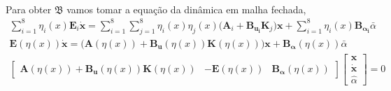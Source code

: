 \documentclass[a4paper,10pt]{article}
\begin{document}
\paragraph{}Para obter $\mathfrak{B}$ vamos tomar a equação da dinâmica em malha fechada,
\begin{gather}
	\sum_{i=1}^{8}\eta_i(x)\bm{E}_i\dot{\bm{x}} = \sum_{i=1}^{8}\sum_{j=1}^{8}\eta_i(x)\eta_j(x)\big(\bm{A}_{i}+\bm{B_{u_{i}}}\bm{K}_{j}\big)\bm{x}  + \sum_{i=1}^{8}\eta_i(x)\bm{B_{\alpha_{i}}}\bar{\alpha} \\
	\bm{E}(\eta(x))\dot{\bm{x}} = \big(\bm{A}(\eta(x))+\bm{B_u}(\eta(x))\bm{K}(\eta(x))\big)\bm{x} + \bm{B_{\alpha}}(\eta(x))\bar{\alpha} \\
	\begin{bmatrix}
		\bm{A}(\eta(x))+\bm{B_u}(\eta(x))\bm{K}(\eta(x)) & -\bm{E}(\eta(x)) & \bm{B_{\alpha}}(\eta(x))
			\end{bmatrix}\begin{bmatrix}
			\bm{x} \\ \dot{\bm{x}} \\ \hat{\alpha}
		\end{bmatrix} = 0
\end{gather}
\end{document}
